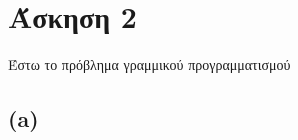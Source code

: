 \documentclass[12pt]{report}
\begin{document}
\section*{Άσκηση 2}
Έστω το πρόβλημα γραμμικού προγραμματισμού \\

\subsection*{(a)}





\end{document}

